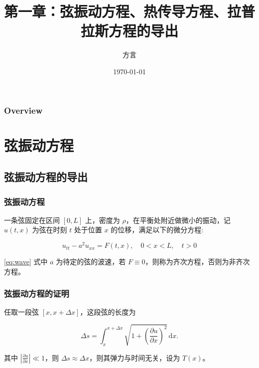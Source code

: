 \documentclass{beamer}
\title[第一章]{第一章：弦振动方程、热传导方程、拉普拉斯方程的导出}
\author{方言} %
\institute[SJTU] %
{
	上海交通大学 \\ %
	\medskip
	\textit{fangyan\_pj@sjtu.edu.cn} %
}
\date{\today} %
\begin{document}
\begin{frame}[allowframebreaks]
	\titlepage %
\end{frame}

\begin{frame}[allowframebreaks]%
	\frametitle{Overview} %
	\tableofcontents
\end{frame}


\section{弦振动方程} %
\subsection{弦振动方程的导出} %

\begin{frame}[allowframebreaks]
	\frametitle{弦振动方程}
	一条弦固定在区间 $[0,L]$ 上，密度为 $\rho$，在平衡处附近做微小的振动，记 $u(t,x)$ 为弦在时刻 $t$ 处于位置 $x$ 的位移，满足以下的微分方程:

	\begin{equation}
		\label{eq:wave}
		u_{tt} -a^2u_{xx}=F(t,x), \quad 0 < x < L, \quad t > 0
	\end{equation}

	\eqref{eq:wave} 式中 $a$ 为待定的弦的波速，若 $F\equiv 0$，则称为齐次方程，否则为非齐次方程。

\end{frame}

\begin{frame}[allowframebreaks]
	\frametitle{弦振动方程的证明}
	任取一段弦 $[x,x+\Delta x]$，这段弦的长度为

	$$
		\Delta s = \int_x^{x+\Delta x}\sqrt{1+\left(\frac{\partial u}{\partial x}\right)^2}\,\mathrm{d}x.
	$$

	其中 $\left\vert\frac{\partial u}{\partial x}\right\vert\ll 1$，则 $\Delta s \approx \Delta x$，则其弹力与时间无关，设为 $T(x)$。

\end{frame}
\end{document}
